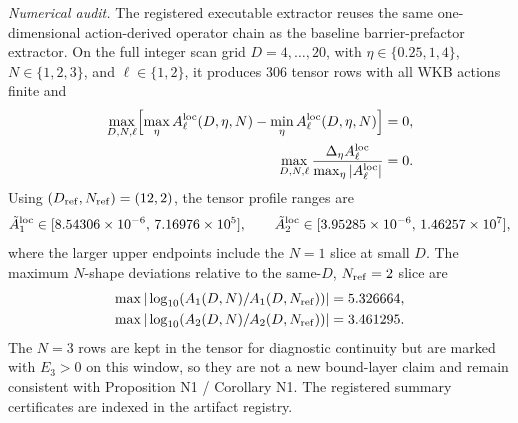 \documentclass[aps,prd,onecolumn,notitlepage,nofootinbib,superscriptaddress,11pt,floatfix]{revtex4-2}
\begin{document}
\medskip\noindent\emph{Numerical audit.}
The registered executable extractor reuses the same one-dimensional action-derived operator chain as the baseline barrier-prefactor extractor.  On the full integer scan grid \(D=4,\dots,20\), with \(\eta\in\{0.25,1,4\}\), \(N\in\{1,2,3\}\), and \(\ell\in\{1,2\}\), it produces \(306\) tensor rows with all WKB actions finite and
\begin{equation}
\begin{aligned}
\max_{D,N,\ell}\Bigl[\max_{\eta} A_\ell^{\rm loc}(D,\eta,N)
-\min_{\eta} A_\ell^{\rm loc}(D,\eta,N)\Bigr]&=0,\\
\max_{D,N,\ell}\frac{\Delta_\eta A_\ell^{\rm loc}}{\max_\eta|A_\ell^{\rm loc}|}&=0.
\end{aligned}
\end{equation}
Using \((D_{\rm ref},N_{\rm ref})=(12,2)\), the tensor profile ranges are
\begin{equation}
\tilde A_1^{\rm loc}\in[8.54306\times10^{-6},\,7.16976\times10^5],
\qquad
\tilde A_2^{\rm loc}\in[3.95285\times10^{-6},\,1.46257\times10^7],
\end{equation}
where the larger upper endpoints include the \(N=1\) slice at small \(D\).  The maximum \(N\)-shape deviations relative to the same-\(D\), \(N_{\rm ref}=2\) slice are
\begin{equation}
\begin{aligned}
\max|\log_{10}(A_1(D,N)/A_1(D,N_{\rm ref}))|&=5.326664,\\
\max|\log_{10}(A_2(D,N)/A_2(D,N_{\rm ref}))|&=3.461295.
\end{aligned}
\end{equation}
The \(N=3\) rows are kept in the tensor for diagnostic continuity but are marked with \(E_3>0\) on this window, so they are not a new bound-layer claim and remain consistent with Proposition N1 / Corollary N1.  The registered summary certificates are indexed in the artifact registry.
\end{document}
